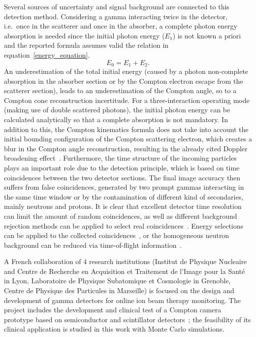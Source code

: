 Several sources of uncertainty and signal background are connected to this detection method. Considering a gamma interacting twice in the detector, i.e.~once in the scatterer and once in the absorber, a complete photon energy absorption is needed since the initial photon energy (\(E_{1}\)) is not known a priori and the reported formula assumes valid the relation in equation~\ref{energy_equation}.
 \begin{equation}
E_{0} = E_{1}+E_{2}.
\label{energy_equation}
\end{equation} 
An underestimation of the total initial energy (caused by a photon non-complete absorption in the absorber section or by the Compton electron escape from the scatterer section), leads to an underestimation of the Compton angle, so to a Compton cone reconstruction incertitude. For a three-interaction operating mode (making use of double scattered photons), the initial photon energy can be calculated analytically so that a complete absorption is not mandatory. In addition to this, the Compton kinematics formula does not take into account the initial bounding configuration of the Compton scattering electron, which creates a blur in the Compton angle reconstruction, resulting in the already cited Doppler broadening effect~\cite{Doppler}. Furthermore, the time structure of the incoming particles plays an important role due to the detection principle, which is based on time coincidences between the two detector sections. The final image accuracy then suffers from false coincidences, generated by two prompt gammas interacting in the same time window or by the contamination of different kind of secondaries, mainly neutrons and protons. It is clear that excellent detector time resolution can limit the amount of random coincidences, as well as different background rejection methods can be applied to select real coincidences~\cite{Draeger:2017aa}. Energy selections can be applied to the collected coincidences~\cite{Polf:2009aa, Hilaire:2016aa}, or the homogeneous neutron background can be reduced via time-of-flight information~\cite{Testa:2010aa}.

A French collaboration of 4 research institutions (Institut de Physique Nucleaire and Centre de Recherche en Acquisition et Traitement de l'Image pour la Sant\'e in Lyon, Laboratoire de Physique Subatomique et Cosmologie in Grenoble, Centre de Physique des Particules in Marseille) is focused on the design and development of gamma detectors for online ion beam therapy monitoring. The project includes the development and clinical test of a Compton camera prototype based on semiconductor and scintillator detectors~\cite{krimmer:hal-01101334}; the feasibility of its clinical application is studied in this work with Monte Carlo simulations.
 
